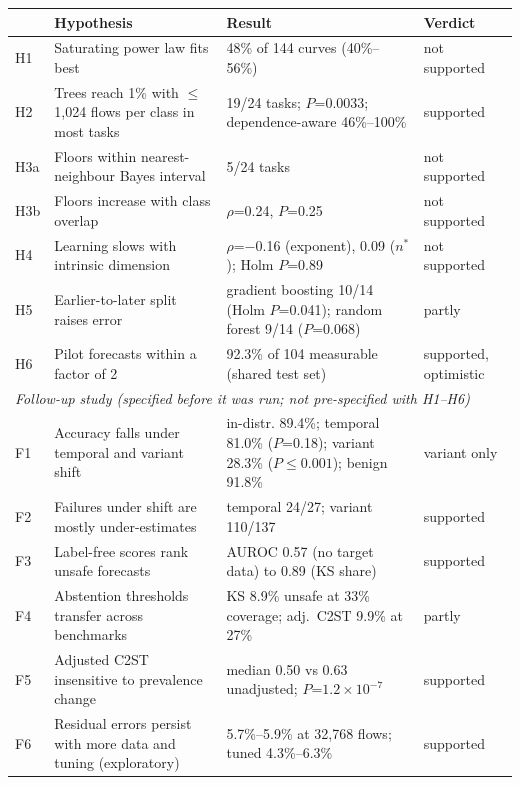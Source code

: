 \begin{tabular}{p{0.75cm}>{\raggedright}p{4.3cm}>{\raggedright}p{6.15cm}>{\raggedright\arraybackslash}p{2.5cm}}
\toprule
& Hypothesis & Result & Verdict \\
\midrule
H1 & Saturating power law fits best & 48\% of 144 curves (40\%--56\%) & not supported \\
H2 & Trees reach 1\% with $\le$1,024 flows per class in most tasks & 19/24 tasks; $P$=0.0033; dependence-aware 46\%--100\% & supported \\
H3a & Floors within nearest-neighbour Bayes interval & 5/24 tasks & not supported \\
H3b & Floors increase with class overlap & $\rho$=0.24, $P$=0.25 & not supported \\
H4 & Learning slows with intrinsic dimension & $\rho$=$-$0.16 (exponent), 0.09 ($n^*$); Holm $P$=0.89 & not supported \\
H5 & Earlier-to-later split raises error & gradient boosting 10/14 (Holm $P$=0.041); random forest 9/14 ($P$=0.068) & partly \\
H6 & Pilot forecasts within a factor of 2 & 92.3\% of 104 measurable (shared test set) & supported, optimistic \\
\midrule \multicolumn{4}{l}{\textit{Follow-up study (specified before it was run; not pre-specified with H1--H6)}} \\ \midrule
F1 & Accuracy falls under temporal and variant shift & in-distr. 89.4\%; temporal 81.0\% ($P$=0.18); variant 28.3\% ($P\le0.001$); benign 91.8\% & variant only \\
F2 & Failures under shift are mostly under-estimates & temporal 24/27; variant 110/137 & supported \\
F3 & Label-free scores rank unsafe forecasts & AUROC 0.57 (no target data) to 0.89 (KS share) & supported \\
F4 & Abstention thresholds transfer across benchmarks & KS 8.9\% unsafe at 33\% coverage; adj.\ C2ST 9.9\% at 27\% & partly \\
F5 & Adjusted C2ST insensitive to prevalence change & median 0.50 vs 0.63 unadjusted; $P$=$1.2\times10^{-7}$ & supported \\
F6 & Residual errors persist with more data and tuning (exploratory) & 5.7\%--5.9\% at 32,768 flows; tuned 4.3\%--6.3\% & supported \\
\bottomrule
\end{tabular}
